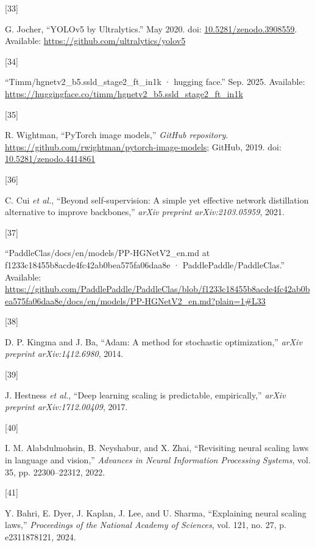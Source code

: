 \documentclass[
  10pt,
]{article}
\newlength{\cslhangindent}
\newlength{\csllabelwidth}
\newenvironment{CSLReferences}[2] %
 {\begin{list}{}{%
  \setlength{\itemindent}{0pt}
  \setlength{\leftmargin}{0pt}
  \setlength{\parsep}{0pt}
  \ifodd #1
   \setlength{\leftmargin}{\cslhangindent}
   \setlength{\itemindent}{-1\cslhangindent}
  \fi
  \setlength{\itemsep}{#2\baselineskip}}}
 {\end{list}}
\newcommand{\CSLLeftMargin}[1]{\parbox[t]{\csllabelwidth}{\strut#1\strut}}
\newcommand{\CSLRightInline}[1]{\parbox[t]{\linewidth - \csllabelwidth}{\strut#1\strut}}
\begin{document}
\begin{CSLReferences}{0}{0}
\CSLLeftMargin{{[}33{]} }%
\CSLRightInline{G. Jocher, {``{YOLOv5 by Ultralytics}.''} May 2020. doi:
\href{https://doi.org/10.5281/zenodo.3908559}{10.5281/zenodo.3908559}.
Available: \url{https://github.com/ultralytics/yolov5}}

\CSLLeftMargin{{[}34{]} }%
\CSLRightInline{{``Timm/hgnetv2\_b5.ssld\_stage2\_ft\_in1k · hugging
face.''} Sep. 2025. Available:
\url{https://huggingface.co/timm/hgnetv2_b5.ssld_stage2_ft_in1k}}

\CSLLeftMargin{{[}35{]} }%
\CSLRightInline{R. Wightman, {``PyTorch image models,''} \emph{GitHub
repository}. \url{https://github.com/rwightman/pytorch-image-models};
GitHub, 2019. doi:
\href{https://doi.org/10.5281/zenodo.4414861}{10.5281/zenodo.4414861}}

\CSLLeftMargin{{[}36{]} }%
\CSLRightInline{C. Cui \emph{et al.}, {``Beyond self-supervision: A
simple yet effective network distillation alternative to improve
backbones,''} \emph{arXiv preprint arXiv:2103.05959}, 2021.}

\CSLLeftMargin{{[}37{]} }%
\CSLRightInline{{``PaddleClas/docs/en/models/PP-HGNetV2\_en.md at
f1233c18455b8acde4fc42ab0bea575fa06daa8e · PaddlePaddle/PaddleClas.''}
Available:
\url{https://github.com/PaddlePaddle/PaddleClas/blob/f1233c18455b8acde4fc42ab0bea575fa06daa8e/docs/en/models/PP-HGNetV2_en.md?plain=1\#L33}}

\CSLLeftMargin{{[}38{]} }%
\CSLRightInline{D. P. Kingma and J. Ba, {``Adam: A method for stochastic
optimization,''} \emph{arXiv preprint arXiv:1412.6980}, 2014.}

\CSLLeftMargin{{[}39{]} }%
\CSLRightInline{J. Hestness \emph{et al.}, {``Deep learning scaling is
predictable, empirically,''} \emph{arXiv preprint arXiv:1712.00409},
2017.}

\CSLLeftMargin{{[}40{]} }%
\CSLRightInline{I. M. Alabdulmohsin, B. Neyshabur, and X. Zhai,
{``Revisiting neural scaling laws in language and vision,''}
\emph{Advances in Neural Information Processing Systems}, vol. 35, pp.
22300--22312, 2022.}

\CSLLeftMargin{{[}41{]} }%
\CSLRightInline{Y. Bahri, E. Dyer, J. Kaplan, J. Lee, and U. Sharma,
{``Explaining neural scaling laws,''} \emph{Proceedings of the National
Academy of Sciences}, vol. 121, no. 27, p. e2311878121, 2024.}

\end{CSLReferences}
\end{document}
